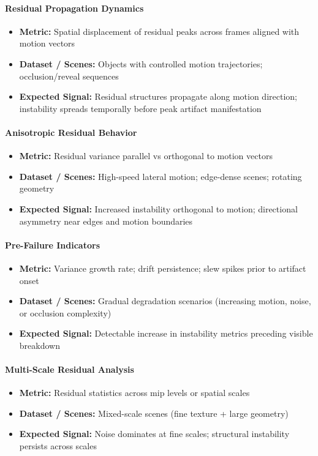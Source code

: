 \documentclass[11pt,letterpaper]{article}
\theoremstyle{gcresult}
\theoremstyle{definition}
\begin{document}
\paragraph{Residual Propagation Dynamics}
\begin{itemize}
    \item \textbf{Metric:} Spatial displacement of residual peaks across frames aligned with motion vectors
    \item \textbf{Dataset / Scenes:} Objects with controlled motion trajectories; occlusion/reveal sequences
    \item \textbf{Expected Signal:} Residual structures propagate along motion direction; instability spreads temporally before peak artifact manifestation
\end{itemize}

\paragraph{Anisotropic Residual Behavior}
\begin{itemize}
    \item \textbf{Metric:} Residual variance parallel vs orthogonal to motion vectors
    \item \textbf{Dataset / Scenes:} High-speed lateral motion; edge-dense scenes; rotating geometry
    \item \textbf{Expected Signal:} Increased instability orthogonal to motion; directional asymmetry near edges and motion boundaries
\end{itemize}

\paragraph{Pre-Failure Indicators}
\begin{itemize}
    \item \textbf{Metric:} Variance growth rate; drift persistence; slew spikes prior to artifact onset
    \item \textbf{Dataset / Scenes:} Gradual degradation scenarios (increasing motion, noise, or occlusion complexity)
    \item \textbf{Expected Signal:} Detectable increase in instability metrics preceding visible breakdown
\end{itemize}

\paragraph{Multi-Scale Residual Analysis}
\begin{itemize}
    \item \textbf{Metric:} Residual statistics across mip levels or spatial scales
    \item \textbf{Dataset / Scenes:} Mixed-scale scenes (fine texture + large geometry)
    \item \textbf{Expected Signal:} Noise dominates at fine scales; structural instability persists across scales
\end{itemize}
\end{document}

